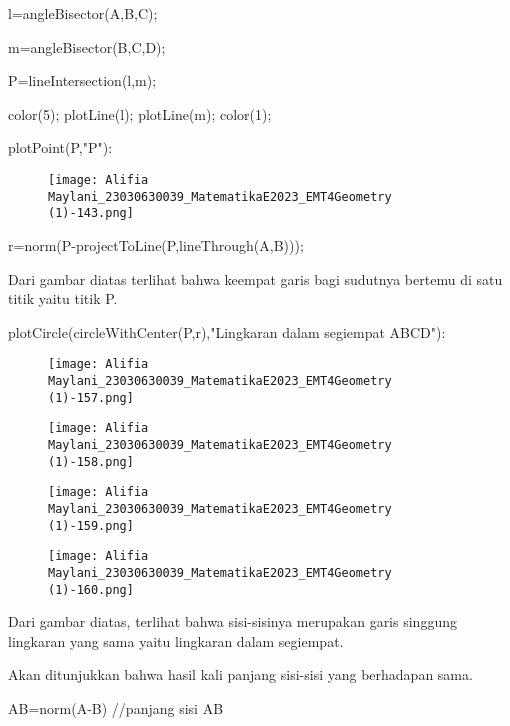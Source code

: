 \documentclass{article}
\begin{document}
\>l=angleBisector(A,B,C);

\>m=angleBisector(B,C,D);

\>P=lineIntersection(l,m);

\>color(5); plotLine(l); plotLine(m); color(1);

\>plotPoint(P,"P"):


\begin{figure}
    \centering
    \texttt{[image: Alifia Maylani\_23030630039\_MatematikaE2023\_EMT4Geometry (1)-143.png]}
    \caption{}
    \label{fig:enter-label}
\end{figure}

\>r=norm(P-projectToLine(P,lineThrough(A,B)));


Dari gambar diatas terlihat bahwa keempat garis bagi sudutnya bertemu
di satu titik yaitu titik P.


\>plotCircle(circleWithCenter(P,r),"Lingkaran dalam segiempat ABCD"):


\begin{figure}
    \centering
    \texttt{[image: Alifia Maylani\_23030630039\_MatematikaE2023\_EMT4Geometry (1)-157.png]}
    \caption{}
    \label{fig:enter-label}
\end{figure}

\begin{figure}
    \centering
    \texttt{[image: Alifia Maylani\_23030630039\_MatematikaE2023\_EMT4Geometry (1)-158.png]}
    \caption{}
    \label{fig:enter-label}
\end{figure}

\begin{figure}
    \centering
    \texttt{[image: Alifia Maylani\_23030630039\_MatematikaE2023\_EMT4Geometry (1)-159.png]}
    \caption{}
    \label{fig:enter-label}
\end{figure}

\begin{figure}
    \centering
    \texttt{[image: Alifia Maylani\_23030630039\_MatematikaE2023\_EMT4Geometry (1)-160.png]}
    \caption{}
    \label{fig:enter-label}
\end{figure}

Dari gambar diatas, terlihat bahwa sisi-sisinya merupakan garis
singgung lingkaran yang sama yaitu lingkaran dalam segiempat.


Akan ditunjukkan bahwa hasil kali panjang sisi-sisi yang berhadapan
sama.


\>AB=norm(A-B) //panjang sisi AB
\end{document}
